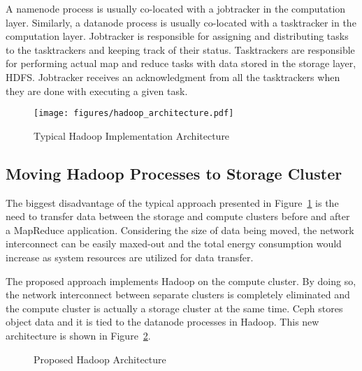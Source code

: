A namenode process is usually co-located with a jobtracker in the computation layer. Similarly,
a datanode process is usually co-located with a tasktracker in the computation layer. Jobtracker
is responsible for assigning and distributing tasks to the tasktrackers and keeping track of
their status. Tasktrackers are responsible for performing actual map and reduce tasks with
data stored in the storage layer, HDFS. Jobtracker receives an acknowledgment from all the
tasktrackers when they are done with executing a given task.

\begin{figure}[!htbp]
\centering
\texttt{[image: figures/hadoop\_architecture.pdf]}
\caption{Typical Hadoop Implementation Architecture}
\label{hadoop_arch}
\end{figure}

\subsection{Moving Hadoop Processes to Storage Cluster}
The biggest disadvantage of the typical approach presented in Figure~\ref{hadoop_arch}
is the need to transfer data between the storage and compute clusters before and
after a MapReduce application. Considering the size of data being moved, the network
interconnect can be easily maxed-out and the total energy consumption would increase
as system resources are utilized for data transfer.

The proposed approach implements Hadoop on the compute cluster. By doing so, the network
interconnect between separate clusters is completely eliminated and the compute cluster is
actually a storage cluster at the same time. Ceph stores object data and it is tied to
the datanode processes in Hadoop. This new architecture is shown in Figure~\ref{new_arch}.


\begin{figure}[!htbp]
\centering
{}
\caption{Proposed Hadoop Architecture}
\label{new_arch}
\end{figure}

